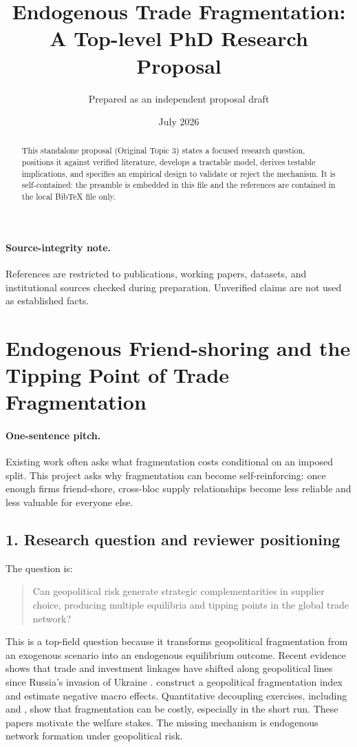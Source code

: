 \documentclass[11pt]{article}
\title{Endogenous Trade Fragmentation: A Top-level PhD Research Proposal}
\author{Prepared as an independent proposal draft}
\date{July 2026}
\begin{document}
\maketitle
\begin{abstract}
This standalone proposal (Original Topic 3) states a focused research question, positions it against verified literature, develops a tractable model, derives testable implications, and specifies an empirical design to validate or reject the mechanism. It is self-contained: the preamble is embedded in this file and the references are contained in the local BibTeX file only.
\end{abstract}

\paragraph{Source-integrity note.} References are restricted to publications, working papers, datasets, and institutional sources checked during preparation. Unverified claims are not used as established facts.

\section{Endogenous Friend-shoring and the Tipping Point of Trade Fragmentation}

\paragraph{One-sentence pitch.} Existing work often asks what fragmentation costs conditional on an imposed split. This project asks why fragmentation can become self-reinforcing: once enough firms friend-shore, cross-bloc supply relationships become less reliable and less valuable for everyone else.

\subsection*{1. Research question and reviewer positioning}
The question is:
\begin{quote}
Can geopolitical risk generate strategic complementarities in supplier choice, producing multiple equilibria and tipping points in the global trade network?
\end{quote}
This is a top-field question because it transforms geopolitical fragmentation from an exogenous scenario into an endogenous equilibrium outcome. Recent evidence shows that trade and investment linkages have shifted along geopolitical lines since Russia's invasion of Ukraine \citep{GopinathEtAl2025JIE}. \citet{FernandezVillaverdeMineyamaSong2024} construct a geopolitical fragmentation index and estimate negative macro effects. Quantitative decoupling exercises, including \citet{BaqaeeEtAl2024} and \citet{AttinasiBoeckelmannMeunier2023}, show that fragmentation can be costly, especially in the short run. These papers motivate the welfare stakes. The missing mechanism is endogenous network formation under geopolitical risk.
\end{document}
